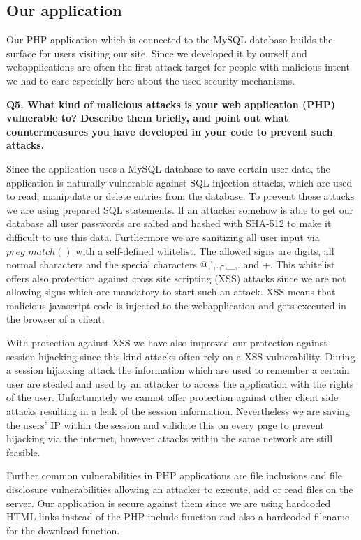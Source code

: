 \subsection {Our application}
Our PHP application which is connected to the MySQL database builds the surface for users visiting our site. Since we developed it by ourself and webapplications are often the first attack target for people with malicious intent we had to care especially here about the used security mechanisms.
\newline

\noindent
{\bf Q5. What kind of malicious attacks is your web application (PHP) vulnerable to? Describe them briefly, and point out what countermeasures you have
developed in your code to prevent such attacks.}
\newline

\noindent
Since the application uses a MySQL database to save certain user data, the application is naturally vulnerable against SQL injection attacks, which are used to read, manipulate or delete entries from the database. To prevent those attacks we are using prepared SQL statements. If an attacker somehow is able to get our database all user passwords are salted and hashed with SHA-512 to make it difficult to use this data. Furthermore we are sanitizing all user input via $preg\_match()$ with a self-defined whitelist. The allowed signs are digits, all normal characters and the special characters @,!,.,-,\_,. and +. This whitelist offers also protection against cross site scripting (XSS) attacks since we are not allowing signs which are mandatory to start such an attack. XSS means that malicious javascript code is injected to the webapplication and gets executed in the browser of a client. \cite {sqlinjection, xss}
\newline

\noindent
With protection against XSS we have also improved our protection against session hijacking since this kind attacks often rely on a XSS vulnerability. During a session hijacking attack the information which are used to remember a certain user are stealed and used by an attacker to access the application with the rights of the user. Unfortunately we cannot offer protection against other client side attacks resulting in a leak of the session information. Nevertheless we are saving the users' IP within the session and validate this on every page to prevent hijacking via the internet, however attacks within the same network are still feasible.
\newline

\noindent
Further common vulnerabilities in PHP applications are file inclusions and file disclosure vulnerabilities allowing an attacker to execute, add or read files on the server. Our application is secure against them since we are using hardcoded HTML links instead of the PHP include function and also a hardcoded filename for the download function.











